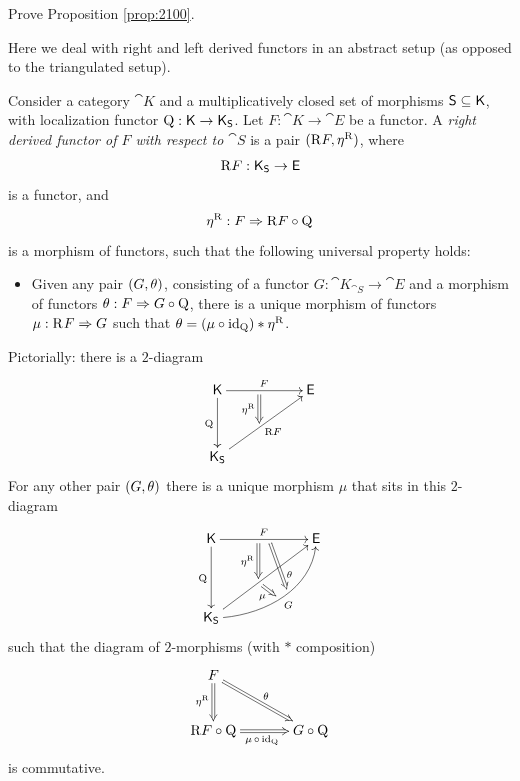 \begin{exer} \label{exer:2100}
Prove Proposition \ref{prop:2100}.
\end{exer}




 \label{subsec:abstr-der-funs}

Here we deal with right and left derived functors in an abstract setup (as 
opposed to the triangulated setup). 

\begin{dfn} \label{dfn:2080}
Consider a category $\cat{K}$ and a multiplicatively closed set of morphisms 
$\operatorname{\mathsf{S}} \subseteq \operatorname{\mathsf{K}}$, with localization functor 
$\operatorname{Q} : \operatorname{\mathsf{K}} \to \operatorname{\mathsf{K}}_{\operatorname{\mathsf{S}}}$. 
Let $F : \cat{K} \to \cat{E}$ be a functor. A
{\em right derived functor of $F$ with respect to $\cat{S}$}
is a pair $(\mathrm{R} F, \eta^{\mathrm{R}})$, where 
\[ \mathrm{R} F : \operatorname{\mathsf{K}}_{\operatorname{\mathsf{S}}} \to \operatorname{\mathsf{E}} \]
is a functor, and 
\[ \eta^{\mathrm{R}} : F \Rightarrow \mathrm{R} F \circ \operatorname{Q} \] 
is a morphism of functors, such that the following universal property holds:
\begin{itemize}
\item[(R)] Given any pair $(G, \theta)$, consisting of a functor
$G : \cat{K}_{\cat{S}} \to \cat{E}$ 
and a morphism of functors 
$\theta : F \Rightarrow G \circ \operatorname{Q}$,
there is a unique morphism of functors 
$\mu : \mathrm{R}^{} F \Rightarrow G$
such that 
$\theta = (\mu \circ \operatorname{id}_{\operatorname{Q}}) * \eta^{\mathrm{R}}$.
\end{itemize}
\end{dfn}

Pictorially: there is a $2$-diagram 
\[ \UseTips  \xymatrix @C=12ex @R=8ex  {
\cat{K}
\ar[r]^{F}_(0.45){}="q" 
\ar[d]_{\opn{Q}}
& 
\cat{E} 
\\
\cat{K}_{\cat{S}}
\ar[ur]_{\mrm{R} F} ^(0.45){}="f"
\ar@{=>}  "q";"f" _{\eta^{\mrm{R}}}
} \]
For any other pair $(G, \theta)$ there is a unique morphism $\mu$ that sits in 
this $2$-diagram 
\[ \UseTips  \xymatrix @C=14ex @R=10ex {
\cat{K}
\ar[r]^{F} _(0.45){}="q"  ^(0.55){}="q2" 
\ar[d]_{\opn{Q}}
& 
\cat{E} 
\\
\cat{K}_{\cat{S}}
\ar[ur] ^(0.45){}="f" ^(0.5){}="f1" 
\ar@{=>}  "q";"f" _{\eta^{\mrm{R}}}
\ar@(r,d)[ru]_{G} ^(0.55){}="g"  ^(0.48){}="g1"
\ar@{=>}  "q2";"g" ^(0.7){\th}
\ar@{=>}  "f";"g1" _(0.45){\mu}
} \]
such that the diagram of $2$-morphisms (with $*$ composition) 
\[ \UseTips \xymatrix @C=8ex @R=6ex { 
F
\ar@{=>}[d]_(0.45){\eta^{\mrm{R}}}
\ar@{=>}[dr]^{\th}
&
\\
\mrm{R} F \circ \opn{Q}
\ar@{=>}[r]_{\mu \, \circ \, \opn{id}_{\opn{Q}}}
&
G \circ \opn{Q}
} \]
is commutative. 

